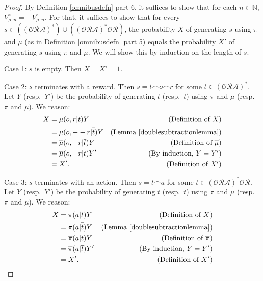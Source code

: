 \documentclass{article}
\begin{document}
\begin{proof}
    By Definition \ref{omnibusdefn} part 6,
    it suffices to show that for each $n\in\mathbb N$,
    $V^{\overline \pi}_{\overline \mu,n}=-V^\pi_{\mu,n}$.
    For that, it suffices to show that for every
    $s\in ((\mathcal O\mathcal R\mathcal A)^*)
    \cup ((\mathcal O\mathcal R\mathcal A)^*\mathcal O\mathcal R)$,
    the probability $X$ of generating $s$ using $\pi$ and $\mu$
    (as in Definition \ref{omnibusdefn} part 5)
    equals the probability $X'$ of generating $\overline s$
    using $\overline \pi$ and $\overline \mu$.
    We will show this by induction on the length of $s$.

    Case 1: $s$ is empty. Then $X=X'=1$.

    Case 2: $s$ terminates with a reward.
    Then $s=t\frown o \frown r$
    for some $t\in (\mathcal O\mathcal R\mathcal A)^*$.
    Let $Y$ (resp.\ $Y'$) be the probability of generating $t$
    (resp.\ $\overline t$)
    using $\pi$ and $\mu$ (resp.\ $\overline \pi$ and $\overline \mu$). We reason:
    \begin{align*}
        X &= \mu(o,r|t)Y
            &\mbox{(Definition of $X$)}\\
          &= \mu(o,--r| \overline{\overline t})Y
            &\mbox{(Lemma \ref{doublesubtractionlemma})}\\
          &= \overline \mu(o,-r| \overline t)Y
            &\mbox{(Definition of $\overline\mu$)}\\
          &= \overline \mu(o,-r| \overline t)Y'
            &\mbox{(By induction, $Y=Y'$)}\\
          &= X'. &\mbox{(Definition of $X'$)}
    \end{align*}

    Case 3: $s$ terminates with an action.
    Then $s=t\frown a$ for some $t\in(\mathcal O\mathcal R\mathcal A)^*\mathcal O\mathcal R$.
    Let $Y$ (resp.\ $Y'$) be the probability of generating $t$
    (resp.\ $\overline t$)
    using $\pi$ and $\mu$ (resp.\ $\overline\pi$ and $\overline\mu$). We reason:
    \begin{align*}
        X &= \pi(a|t)Y
            &\mbox{(Definition of $X$)}\\
          &= \pi(a|\overline{\overline t})Y
            &\mbox{(Lemma \ref{doublesubtractionlemma})}\\
          &= \overline \pi(a|\overline t)Y
            &\mbox{(Definition of $\overline \pi$)}\\
          &= \overline \pi(a|\overline t)Y'
            &\mbox{(By induction, $Y=Y'$)}\\
          &= X'. &\mbox{(Definition of $X'$)}
    \end{align*}
\end{proof}
\end{document}
